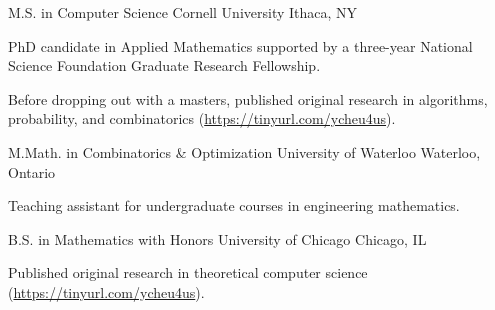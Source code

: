 

\begin{cventries}

  \cventry
    {M.S. in Computer Science} %
    {Cornell University} %
    {Ithaca, NY} %
    {} %
    {
      \begin{cvitems} %
        \item {PhD candidate in Applied Mathematics supported by a three-year National Science Foundation Graduate Research Fellowship.}
        \item {Before dropping out with a masters, published original research in algorithms, probability, and combinatorics (\url{https://tinyurl.com/ycheu4us}).}
      \end{cvitems}
    }

  \cventry
    {M.Math. in Combinatorics \& Optimization} %
    {University of Waterloo} %
    {Waterloo, Ontario} %
    {} %
    {
      \begin{cvitems} %
        \item {Teaching assistant for undergraduate courses in engineering mathematics.}
      \end{cvitems}
    }

  \cventry
    {B.S. in Mathematics with Honors} %
    {University of Chicago} %
    {Chicago, IL} %
    {} %
    {
      \begin{cvitems} %
        \item {Published original research in theoretical computer science (\url{https://tinyurl.com/ycheu4us}).}
      \end{cvitems}
    }

\end{cventries}
